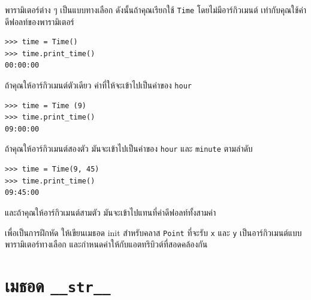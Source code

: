 
พารามิเตอร์ต่าง ๆ เป็นแบบทางเลือก ดังนั้นถ้าคุณเรียกใช้ {\tt Time} โดยไม่มีอาร์กิวเมนต์ เท่ากับคุณใช้ค่าดีฟอลท์ของพารามิเตอร์

\begin{verbatim}
>>> time = Time()
>>> time.print_time()
00:00:00
\end{verbatim}
%

ถ้าคุณให้อาร์กิวเมนต์ตัวเดียว ค่าที่ให้จะเข้าไปเป็นค่าของ {\tt hour}

\begin{verbatim}
>>> time = Time (9)
>>> time.print_time()
09:00:00
\end{verbatim}
%

ถ้าคุณให้อาร์กิวเมนต์สองตัว มันจะเข้าไปเป็นค่าของ {\tt hour} และ {\tt minute} ตามลำดับ

\begin{verbatim}
>>> time = Time(9, 45)
>>> time.print_time()
09:45:00
\end{verbatim}
%

และถ้าคุณให้อาร์กิวเมนต์สามตัว มันจะเข้าไปแทนที่ค่าดีฟอลท์ทั้งสามค่า


เพื่อเป็นการฝึกหัด ให้เขียนเมธอด init สำหรับคลาส {\tt Point} ที่จะรับ {\tt x} และ {\tt y} เป็นอาร์กิวเมนต์แบบพารามิเตอร์ทางเลือก และกำหนดค่าให้กับแอตทริบิวต์ที่สอดคล้องกัน


\section{เมธอด \texttt{\_\_str\_\_} } %


